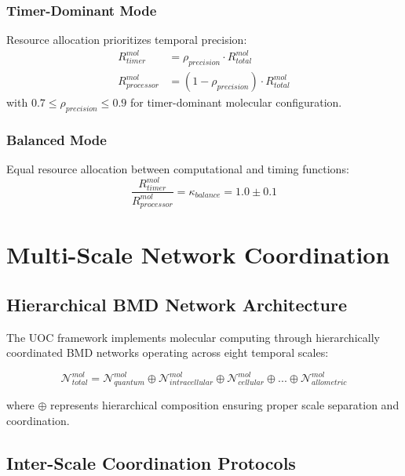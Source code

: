 \documentclass[12pt,a4paper]{article}
\begin{document}
\subsubsection{Timer-Dominant Mode}

Resource allocation prioritizes temporal precision:
\begin{align}
R_{timer}^{mol} &= \rho_{precision} \cdot R_{total}^{mol} \\
R_{processor}^{mol} &= (1 - \rho_{precision}) \cdot R_{total}^{mol}
\end{align}
with $0.7 \leq \rho_{precision} \leq 0.9$ for timer-dominant molecular configuration.

\subsubsection{Balanced Mode}

Equal resource allocation between computational and timing functions:
\begin{equation}
\frac{R_{timer}^{mol}}{R_{processor}^{mol}} = \kappa_{balance} = 1.0 \pm 0.1
\end{equation}

\section{Multi-Scale Network Coordination}

\subsection{Hierarchical BMD Network Architecture}

The UOC framework implements molecular computing through hierarchically coordinated BMD networks operating across eight temporal scales:

\begin{equation}
\mathcal{N}_{total}^{mol} = \mathcal{N}_{quantum}^{mol} \oplus \mathcal{N}_{intracellular}^{mol} \oplus \mathcal{N}_{cellular}^{mol} \oplus ... \oplus \mathcal{N}_{allometric}^{mol}
\end{equation}

where $\oplus$ represents hierarchical composition ensuring proper scale separation and coordination.

\subsection{Inter-Scale Coordination Protocols}
\end{document}
